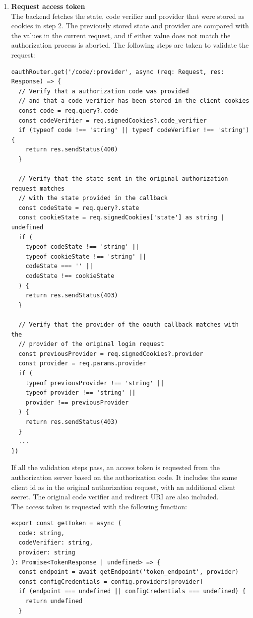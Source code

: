 \begin{enumerate}
    \item \textbf{Request access token} \\
    The backend fetches the state, code verifier and provider that were stored as cookies in step 2.
    The previously stored state and provider are compared with the values in the current request, and if either value does not match the authorization process is aborted.
    The following steps are taken to validate the request:
    \begin{lstlisting}[style=ES6, caption={Part of the backend code callback route that deals with validating the request}]
oauthRouter.get('/code/:provider', async (req: Request, res: Response) => {
  // Verify that a authorization code was provided
  // and that a code verifier has been stored in the client cookies
  const code = req.query?.code
  const codeVerifier = req.signedCookies?.code_verifier
  if (typeof code !== 'string' || typeof codeVerifier !== 'string') {
    return res.sendStatus(400)
  }

  // Verify that the state sent in the original authorization request matches
  // with the state provided in the callback
  const codeState = req.query?.state
  const cookieState = req.signedCookies['state'] as string | undefined
  if (
    typeof codeState !== 'string' ||
    typeof cookieState !== 'string' ||
    codeState === '' ||
    codeState !== cookieState
  ) {
    return res.sendStatus(403)
  }

  // Verify that the provider of the oauth callback matches with the
  // provider of the original login request
  const previousProvider = req.signedCookies?.provider
  const provider = req.params.provider
  if (
    typeof previousProvider !== 'string' ||
    typeof provider !== 'string' ||
    provider !== previousProvider
  ) {
    return res.sendStatus(403)
  }
  ...
})
\end{lstlisting}

    If all the validation steps pass, an access token is requested from the authorization server based on the authorization code.
    It includes the same client id as in the original authorization request, with an additional client secret.
    The original code verifier and redirect URI are also included. \\
    The access token is requested with the following function:
    \begin{lstlisting}[style=ES6, caption={Function used to request an access token and refresh token}]
export const getToken = async (
  code: string,
  codeVerifier: string,
  provider: string
): Promise<TokenResponse | undefined> => {
  const endpoint = await getEndpoint('token_endpoint', provider)
  const configCredentials = config.providers[provider]
  if (endpoint === undefined || configCredentials === undefined) {
    return undefined
  }


\end{lstlisting}
\end{enumerate}
